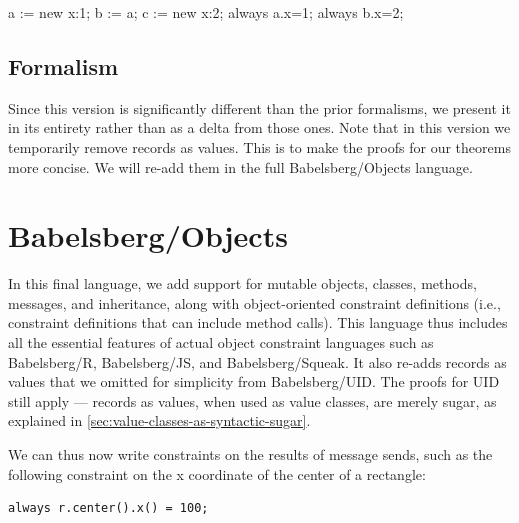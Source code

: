 \documentclass{article}
\newcommand{\Ccal}{$\mathbb{C}$}
\newcommand{\Ical}{$\mathbb{I}$}
\newcommand{\C}{\Ccal}
\renewcommand{\C}{\Ccal}
\newcommand{\I}{\Ical}
\begin{document}
\begin{example}
a := new {x:1};
b := a;
c := new {x:2};
always a.x=1;
always b.x=2;
\end{example}

\subsection{Formalism}

Since this version is significantly different than the prior formalisms, 
we present it in its entirety rather than as a delta from those ones.
Note that in this version we temporarily remove records as values. This
is to make the proofs for our theorems more concise. We will re-add them
in the full Babelsberg/Objects language.

\newcommand{\sharedsection}{\subsubsection}


\section{Babelsberg/Objects}
\label{sec:babelsberg-objects}
\renewcommand{\C}{\Ccal}
\renewcommand{\I}{\Ical}

In this final language, we add support for mutable objects, classes,
methods, messages, and inheritance, along with object-oriented
constraint definitions (i.e., constraint definitions that can include
method calls).  This language thus includes all the essential features
of actual object constraint languages such as Babelsberg/R,
Babelsberg/JS, and Babelsberg/Squeak. It also re-adds records as values
that
we omitted for simplicity from Babelsberg/UID. The proofs for UID
still apply --- records as values, when used as value classes, are merely
sugar, as explained in \autoref{sec:value-classes-as-syntactic-sugar}.

We can thus now write constraints on the results of message sends,
such as the following constraint on the x coordinate of the center of
a rectangle:
\begin{verbatim}
always r.center().x() = 100;
\end{verbatim}

\end{document}
